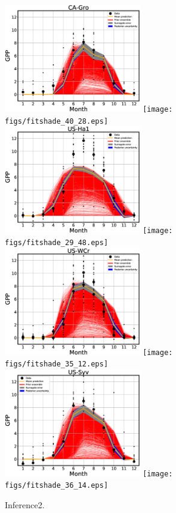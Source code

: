 \documentclass[12pt]{article}
\begin{document}
\begin{figure}[!hb]
\includegraphics[width=0.53\textwidth]{figs/fit1d_40_28.eps}\hfill
\texttt{[image: figs/fitshade\_40\_28.eps]}\\
\includegraphics[width=0.53\textwidth]{figs/fit1d_29_48.eps}\hfill
\texttt{[image: figs/fitshade\_29\_48.eps]}\\
\includegraphics[width=0.53\textwidth]{figs/fit1d_35_12.eps}\hfill
\texttt{[image: figs/fitshade\_35\_12.eps]}\\
\includegraphics[width=0.53\textwidth]{figs/fit1d_36_14.eps}\hfill
\texttt{[image: figs/fitshade\_36\_14.eps]}
\caption{\label{fig:fits2} Inference2.}
\end{figure}


\end{document}
